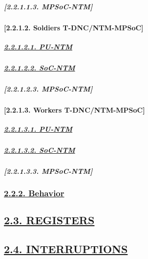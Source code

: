 \documentclass[
]{article}
\begin{document}
\hypertarget{mpsoc-ntm}{%
\subparagraph{{[}2.2.1.1.3. MPSoC-NTM{]}}\label{mpsoc-ntm}}

\hypertarget{soldiers-t-dncntm-mpsoc}{%
\paragraph{{[}2.2.1.2. Soldiers
T-DNC/NTM-MPSoC{]}}\label{soldiers-t-dncntm-mpsoc}}

\hypertarget{pu-ntm-1}{%
\subparagraph{\texorpdfstring{\protect\hyperlink{pu-ntm-4}{2.2.1.2.1.
PU-NTM}}{2.2.1.2.1. PU-NTM}}\label{pu-ntm-1}}

\hypertarget{soc-ntm-1}{%
\subparagraph{\texorpdfstring{\protect\hyperlink{soc-ntm-4}{2.2.1.2.2.
SoC-NTM}}{2.2.1.2.2. SoC-NTM}}\label{soc-ntm-1}}

\hypertarget{mpsoc-ntm-1}{%
\subparagraph{{[}2.2.1.2.3. MPSoC-NTM{]}}\label{mpsoc-ntm-1}}

\hypertarget{workers-t-dncntm-mpsoc}{%
\paragraph{{[}2.2.1.3. Workers
T-DNC/NTM-MPSoC{]}}\label{workers-t-dncntm-mpsoc}}

\hypertarget{pu-ntm-2}{%
\subparagraph{\texorpdfstring{\protect\hyperlink{pu-ntm-5}{2.2.1.3.1.
PU-NTM}}{2.2.1.3.1. PU-NTM}}\label{pu-ntm-2}}

\hypertarget{soc-ntm-2}{%
\subparagraph{\texorpdfstring{\protect\hyperlink{soc-ntm-5}{2.2.1.3.2.
SoC-NTM}}{2.2.1.3.2. SoC-NTM}}\label{soc-ntm-2}}

\hypertarget{mpsoc-ntm-2}{%
\subparagraph{{[}2.2.1.3.3. MPSoC-NTM{]}}\label{mpsoc-ntm-2}}

\hypertarget{behavior}{%
\subsubsection{\texorpdfstring{\protect\hyperlink{behavior-1}{2.2.2.
Behavior}}{2.2.2. Behavior}}\label{behavior}}

\hypertarget{registers}{%
\subsection{\texorpdfstring{\protect\hyperlink{registers-1}{2.3.
REGISTERS}}{2.3. REGISTERS}}\label{registers}}

\hypertarget{interruptions}{%
\subsection{\texorpdfstring{\protect\hyperlink{interruptions-1}{2.4.
INTERRUPTIONS}}{2.4. INTERRUPTIONS}}\label{interruptions}}
\end{document}
